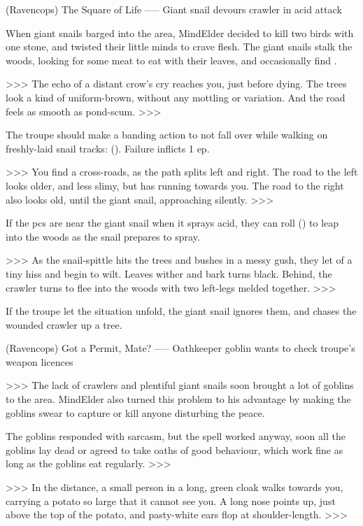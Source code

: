 (Ravencops) The Square of Life
-----
{Giant snail devours \gls{crawler} in acid attack}

When giant snails barged into the area, \gls{MindElder} decided to kill two birds with one stone, and twisted their little minds to crave flesh.
The giant snails stalk the woods, looking for some meat to eat with their leaves, and occasionally find .

>>>
The echo of a distant crow's cry reaches you, just before dying.
The trees look a kind of uniform-brown, without any mottling or variation.
And the road feels as smooth as pond-scum.
>>>

The troupe should make a banding action to not fall over while walking on freshly-laid snail tracks:  (\tn[7]).
Failure inflicts 1 \gls{ep}.

>>>
You find a cross-roads, as the path splits left and right.
The road to the left looks older, and less slimy, but has  running towards you.
The road to the right also looks old, until the giant snail, approaching silently.
>>>

If the \glspl{pc}  are near the giant snail when it sprays acid, they can roll  (\tn[7]) to leap into the woods as the snail prepares to spray.

>>>
As the snail-spittle hits the trees and bushes in a messy gush, they let of a tiny hiss and begin to wilt.
Leaves wither and bark turns black.
Behind, the \gls{crawler} turns to flee into the woods with two left-legs melded together.
>>>

If the troupe let the situation unfold, the giant snail ignores them, and chases the wounded \gls{crawler} up a tree.

(Ravencops) Got a Permit, Mate?
-----
{Oathkeeper goblin wants to check troupe's weapon licences}

>>>
The lack of \glspl{crawler} and plentiful giant snails soon brought a lot of goblins to the area.
\Gls{MindElder} also turned this problem to his advantage by making the goblins swear to capture or kill anyone disturbing the peace.

The goblins responded with sarcasm, but the spell worked anyway, soon all the goblins lay dead or agreed to take oaths of good behaviour, which work fine as long as the goblins eat regularly.
>>>

>>>
In the distance, a small person in a long, green cloak walks towards you, carrying a potato so large that it cannot see you.
A long nose points up, just above the top of the potato, and pasty-white ears flop at shoulder-length.
>>>

